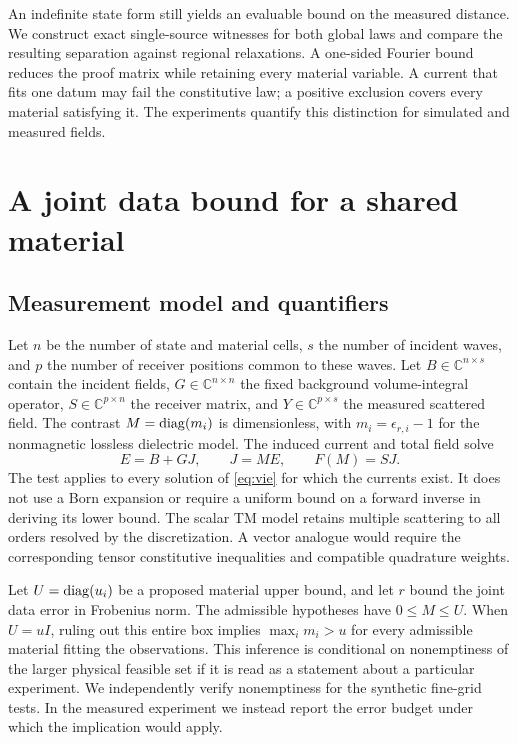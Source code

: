\documentclass[anonymous,12pt]{iopjournal}
\theoremstyle{remark}\newtheorem{remark}[theorem]{Remark}
\newcommand{\C}{\mathbb C}\newcommand{\R}{\mathbb R}
\numberwithin{equation}{section}
\begin{document}
An indefinite state form still yields an evaluable bound on the measured distance. We construct exact single-source witnesses for both global laws and compare the resulting separation against regional relaxations. A one-sided Fourier bound reduces the proof matrix while retaining every material variable. A current that fits one datum may fail the constitutive law; a positive exclusion covers every material satisfying it. The experiments quantify this distinction for simulated and measured fields.

\section{A joint data bound for a shared material}\label{sec:joint}

\subsection{Measurement model and quantifiers}
Let $n$ be the number of state and material cells, $s$ the number of incident waves, and $p$ the number of receiver positions common to these waves. Let $B\in\C^{n\times s}$ contain the incident fields, $G\in\C^{n\times n}$ the fixed background volume-integral operator, $S\in\C^{p\times n}$ the receiver matrix, and $Y\in\C^{p\times s}$ the measured scattered field. The contrast $M=\operatorname{diag}(m_i)$ is dimensionless, with $m_i=\epsilon_{r,i}-1$ for the nonmagnetic lossless dielectric model. The induced current and total field solve
\begin{equation}
 E=B+GJ,\qquad J=ME,\qquad F(M)=SJ. \label{eq:vie}
\end{equation}
The test applies to every solution of \eqref{eq:vie} for which the currents exist. It does not use a Born expansion or require a uniform bound on a forward inverse in deriving its lower bound. The scalar TM model retains multiple scattering to all orders resolved by the discretization. A vector analogue would require the corresponding tensor constitutive inequalities and compatible quadrature weights.

Let $U=\operatorname{diag}(u_i)$ be a proposed material upper bound, and let $r$ bound the joint data error in Frobenius norm. The admissible hypotheses have $0\le M\le U$. When $U=uI$, ruling out this entire box implies $\max_i m_i>u$ for every admissible material fitting the observations. This inference is conditional on nonemptiness of the larger physical feasible set if it is read as a statement about a particular experiment. We independently verify nonemptiness for the synthetic fine-grid tests. In the measured experiment we instead report the error budget under which the implication would apply.
\end{document}
